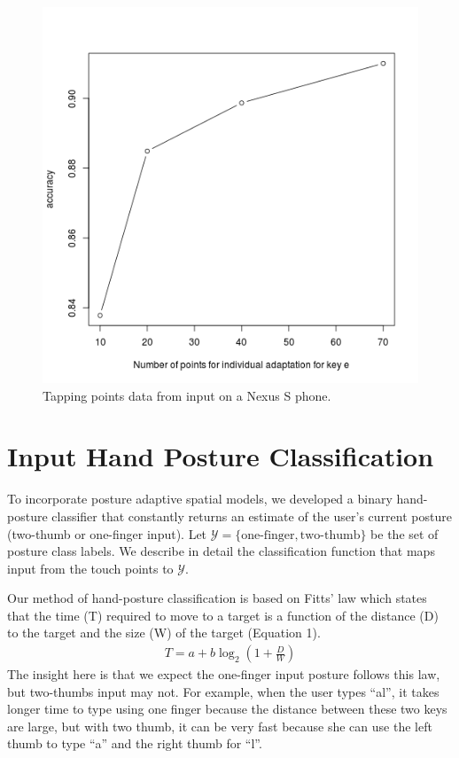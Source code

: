 \documentclass{sigchi}
\begin{document}
\begin{figure}[tb]
  \centering
  \includegraphics[width=0.9\columnwidth]{figures/user-adapt-e.png}
  \caption{Tapping points data from input on a Nexus S phone.}
  \label{fig:user-adapt}
\end{figure}

\section{Input Hand Posture Classification}\label{sec:posture-classification}
To incorporate posture adaptive spatial models, we developed a binary hand-posture classifier 
that constantly returns an estimate of the user's current posture (two-thumb or one-finger input).
Let $\mathcal{Y} = \{\text{one-finger}, \text{two-thumb}\}$ be the set of posture
class labels. We describe in detail the classification function that maps input from the
touch points to $\mathcal{Y}$.

Our method of hand-posture classification is based on Fitts’ law which states that the time (T) required to move to a target is a function of the distance (D) to the target and the size (W) of the target (Equation 1).
\begin{align}
T = a + b\log_2(1 + \frac{D}{W})
\end{align}                                                  
The insight here is that we expect the one-finger input posture follows this law,  but two-thumbs input may not. For example, when the user types “al”, it takes longer time to type using one finger because the distance between these two keys are large, but with two thumb, it can be very fast because she can use the left thumb to type “a” and the right thumb for “l”.
\end{document}
